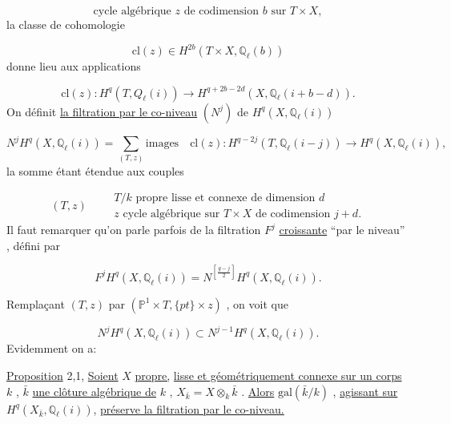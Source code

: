 \begin{equation}\tag{2.0.3}
\text{cycle algébrique } z \text{ de codimension } b \text{ sur } T \times X,
\end{equation}
la classe de cohomologie

\begin{equation}\tag{2.0.4}
\mathrm{cl}(z) \in H^{2b}(T \times X , \mathbb{Q}_\ell(b))
\end{equation}
donne lieu aux applications

\begin{equation}\tag{2.0.5}
\mathrm{cl}(z) : H^q(T, Q_\ell(i)) \longrightarrow H^{q+2b-2d} (X, \mathbb{Q}_\ell(i+b-d)) .
\end{equation}
On définit \underline{la filtration par le co-niveau}  $(N^j)$  de  $H^q(X,\mathbb{Q}_\ell(i))$

\begin{equation}\tag{2.0.6}
N^j H^q(X,\mathbb{Q}_\ell(i)) = \sum_{(T,z)} \text{images} \quad \mathrm{cl}(z) : H^{q-2j}(T,\mathbb{Q}_\ell(i-j)) \longrightarrow H^q(X,\mathbb{Q}_\ell(i)),
\end{equation}
la somme étant étendue aux couples

\begin{equation}\tag{2.0.7}
(T, z) \qquad \begin{array}{l} T/k \text{ propre lisse et connexe de dimension } d \\ z \text{ cycle algébrique sur } T \times X \text{ de codimension } j+d. \end{array}
\end{equation}
Il faut remarquer qu'on parle parfois de la filtration  $F^j$  \underline{croissante} ``par le niveau''  , défini par

\begin{equation}\tag{2.0.8}
F^j H^q(X, \mathbb{Q}_\ell(i)) = N^{\left[\frac{g-j}{2}\right]} H^q(X, \mathbb{Q}_\ell(i)) .
\end{equation}


Remplaçant  $(T, z)$  par  $(\mathbb{P}^1 \times T, \{pt\} \times z)$  , on voit que

\begin{equation}\tag{2.0.9}
N^j H^q(X, \mathbb{Q}_\ell(i)) \subset N^{j-1}H^q(X, \mathbb{Q}_\ell(i)) .
\end{equation}
Evidemment on a:

\underline{Proposition} 2,1,   \underline{Soient}  $X$  \underline{propre,} \underline{lisse et géométriquement connexe sur un corps}  $k$ ,  $\bar{k}$  \underline{une clôture algébrique de}  $k$ ,  $X_{\bar{k}} = X \otimes_k \bar{k}$  .  \underline{Alors}  $\mathrm{gal}(\bar{k}/k)$  , \underline{agissant sur}  $H^q(X_{\bar{k}}, \mathbb{Q}_\ell(i))$, \underline{préserve la filtration par le co-niveau.}

